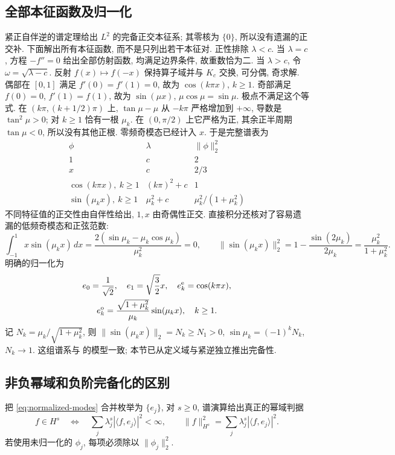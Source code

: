 \documentclass[UTF8]{ctexart}
\begin{document}
\subsection{全部本征函数及归一化}
紧正自伴逆的谱定理给出 $L^2$ 的完备正交本征系; 其零核为 $\{0\}$,
所以没有遗漏的正交补. 下面解出所有本征函数, 而不是只列出若干本征对.
正性排除 $\lambda<c$. 当 $\lambda=c$, 方程 $-f''=0$ 给出全部仿射函数,
均满足边界条件, 故重数恰为二. 当 $\lambda>c$, 令 $\omega=\sqrt{\lambda-c}$.
反射 $f(x)\mapsto f(-x)$ 保持算子域并与 $K_c$ 交换, 可分偶, 奇求解.
偶部在 $[0,1]$ 满足 $f'(0)=f'(1)=0$, 故为 $\cos(k\pi x)$, $k\ge1$.
奇部满足 $f(0)=0$, $f'(1)=f(1)$, 故为 $\sin(\mu x)$,
$\mu\cos\mu=\sin\mu$. 极点不满足这个等式.
在 $(k\pi,(k+1/2)\pi)$ 上, $\tan\mu-\mu$ 从 $-k\pi$ 严格增加到 $+\infty$,
导数是 $\tan^2\mu>0$; 对 $k\ge1$ 恰有一根 $\mu_k$.
在 $(0,\pi/2)$ 上它严格为正, 其余正半周期 $\tan\mu<0$,
所以没有其他正根. 零频奇模态已经计入 $x$.
于是完整谱表为
\[
\begin{array}{c|c|c}
 \phi & \lambda & \|\phi\|_2^2\\ \hline
 1 & c & 2\\
 x & c & 2/3\\
 \cos(k\pi x),\ k\ge1 & (k\pi)^2+c & 1\\
 \sin(\mu_kx),\ k\ge1 & \mu_k^2+c & \mu_k^2/(1+\mu_k^2)
\end{array}
\]
不同特征值的正交性由自伴性给出, $1,x$ 由奇偶性正交.
直接积分还核对了容易遗漏的低频奇模态和正弦范数:
\[
 \int_{-1}^1x\sin(\mu_kx)\,dx
 =\frac{2(\sin\mu_k-\mu_k\cos\mu_k)}{\mu_k^2}=0,\qquad
 \|\sin(\mu_kx)\|_2^2=1-\frac{\sin(2\mu_k)}{2\mu_k}
 =\frac{\mu_k^2}{1+\mu_k^2}.
\]
明确的归一化为
\begin{equation}\label{eq:normalized-modes}
 \begin{gathered}
 e_0=\frac1{\sqrt2},\quad e_1=\sqrt{\frac32}x,\quad
 e_k^{\rm e}=\cos(k\pi x),\\
 e_k^{\rm o}=\frac{\sqrt{1+\mu_k^2}}{\mu_k}\sin(\mu_kx),\quad k\ge1.
 \end{gathered}
\end{equation}
记 $N_k=\mu_k/\sqrt{1+\mu_k^2}$, 则
$\|\sin(\mu_kx)\|_2=N_k\ge N_1>0$,
$\sin\mu_k=(-1)^kN_k$, $N_k\to1$.
这组谱系与 \cite[第2节, 式(7)--(9)]{axioms} 的模型一致;
本节已从定义域与紧逆独立推出完备性.

\subsection{非负幂域和负阶完备化的区别}
把 \eqref{eq:normalized-modes} 合并枚举为 $\{e_j\}$, 对 $s\ge0$,
谱演算给出真正的幂域判据
\begin{equation}\label{eq:spectral-norm}
 f\in H^s\quad\Longleftrightarrow\quad
 \sum_j\lambda_j^s|\langle f,e_j\rangle|^2<\infty,\qquad
 \|f\|_{H^s}^2=\sum_j\lambda_j^s|\langle f,e_j\rangle|^2.
\end{equation}
若使用未归一化的 $\phi_j$, 每项必须除以 $\|\phi_j\|_2^2$.
\end{document}
